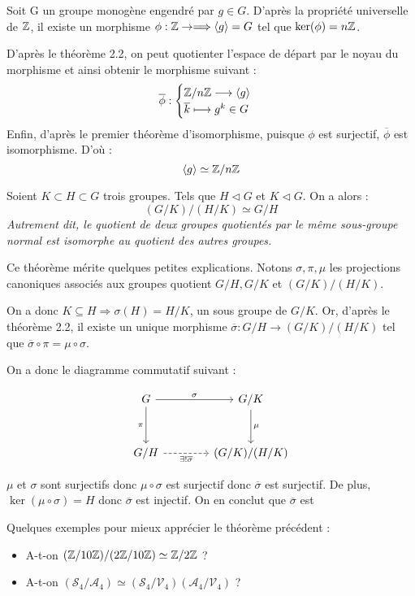 \begin{remark}
	Soit G un groupe monogène engendré par $g \in G$. 
	D'après la propriété universelle de $\mathbb{Z}$, il existe un morphisme $\phi : \mathbb{Z} \to \Longrightarrow \langle g \rangle= G$ tel que $\ker(\phi) = n\mathbb{Z}$. 
	
	D'après le théorème 2.2, on peut quotienter l'espace de départ par le noyau du morphisme et ainsi obtenir le morphisme suivant :
		\[ \overline{\phi} :
			\begin{cases}
				\mathbb{Z}/n\mathbb{Z} \longrightarrow \langle g \rangle \\ 
				\overline{k} \longmapsto g^k \in G 
			\end{cases}
		\] 
	Enfin, d'après le premier théorème d'isomorphisme, puisque $\phi$ est surjectif, $\overline{\phi}$ est isomorphisme. 
	D'où : $$ \langle g \rangle \simeq \mathbb{Z}/n\mathbb{Z} $$  
\end{remark}

\begin{theorem}
	Soient $K \subset H \subset G$ trois groupes. Tels que $H \triangleleft G$ et $ K \triangleleft G$. On a alors :
		\[ (G/K)/(H/K) \simeq G/H \] 
	\emph{Autrement dit, le quotient de deux groupes quotientés par le même sous-groupe normal est isomorphe au quotient des autres groupes.}
\end{theorem}

Ce théorème mérite quelques petites explications. Notons $\sigma, \pi, \mu$ les projections canoniques associés aux groupes quotient $G/H, G/K$ et $(G/K)/(H/K)$. 

On a donc $K \subseteq H \Longrightarrow \sigma(H) = H/K$, un sous groupe de $G/K$. 
Or, d'après le théorème 2.2, il existe un unique morphisme $\overline{\sigma} : G/H \longrightarrow (G/K)/(H/K)$ tel que $\overline{\sigma} \circ \pi = \mu \circ \sigma$. 

\vspace{0.3cm}

On a donc le diagramme commutatif suivant : 

	\[
	\begin{tikzcd}[scale=1.5, row sep=3em, column sep=4em]
		G \arrow[r, "\sigma"] \arrow[d, "\pi" swap] & G/K \arrow[d, "\mu"] \\
		G/H \arrow[r, "\exists ! \overline{\sigma}" swap, dashed] & (G/K)/(H/K)
	\end{tikzcd}
	\]

$\mu$ et $\sigma$ sont surjectifs donc $\mu \circ \sigma$ est surjectif donc $\overline{\sigma}$ est surjectif. 
De plus, $\ker(\mu \circ \sigma) = H$ donc $\overline{\sigma}$ est injectif. On en conclut que $\overline{\sigma}$ est 

\begin{example}
	Quelques exemples pour mieux apprécier le théorème précédent :
	\begin{itemize}
		\item A-t-on $(\mathbb{Z}/10\mathbb{Z})/(2\mathbb{Z}/10\mathbb{Z}) \simeq \mathbb{Z}/2\mathbb{Z}$ ? 
		\item A-t-on $(\mathcal{S}_4/\mathcal{A}_4) \simeq (\mathcal{S}_4/\mathcal{V}_4)(\mathcal{A}_4/\mathcal{V}_4)$ ?
	\end{itemize}
\end{example}